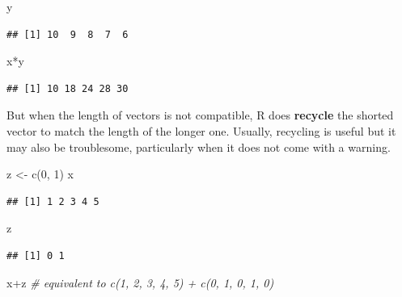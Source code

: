 \documentclass[
]{book}
\newenvironment{Shaded}{\begin{snugshade}}{\end{snugshade}}
\newcommand{\CommentTok}[1]{\textcolor[rgb]{0.56,0.35,0.01}{\textit{#1}}}
\newcommand{\DecValTok}[1]{\textcolor[rgb]{0.00,0.00,0.81}{#1}}
\newcommand{\FunctionTok}[1]{\textcolor[rgb]{0.00,0.00,0.00}{#1}}
\newcommand{\NormalTok}[1]{#1}
\newcommand{\OtherTok}[1]{\textcolor[rgb]{0.56,0.35,0.01}{#1}}
\newcommand{\SpecialCharTok}[1]{\textcolor[rgb]{0.00,0.00,0.00}{#1}}
\begin{document}
\begin{Shaded}
\begin{Highlighting}[]
\NormalTok{y}
\end{Highlighting}
\end{Shaded}

\begin{verbatim}
## [1] 10  9  8  7  6
\end{verbatim}

\begin{Shaded}
\begin{Highlighting}[]
\NormalTok{x}\SpecialCharTok{*}\NormalTok{y}
\end{Highlighting}
\end{Shaded}

\begin{verbatim}
## [1] 10 18 24 28 30
\end{verbatim}

But when the length of vectors is not compatible, R does \textbf{recycle} the shorted vector to match the length of the longer one. Usually, recycling is useful but it may also be troublesome, particularly when it does not come with a warning.

\begin{Shaded}
\begin{Highlighting}[]
\NormalTok{z }\OtherTok{\textless{}{-}} \FunctionTok{c}\NormalTok{(}\DecValTok{0}\NormalTok{, }\DecValTok{1}\NormalTok{)}
\NormalTok{x}
\end{Highlighting}
\end{Shaded}

\begin{verbatim}
## [1] 1 2 3 4 5
\end{verbatim}

\begin{Shaded}
\begin{Highlighting}[]
\NormalTok{z}
\end{Highlighting}
\end{Shaded}

\begin{verbatim}
## [1] 0 1
\end{verbatim}

\begin{Shaded}
\begin{Highlighting}[]
\NormalTok{x}\SpecialCharTok{+}\NormalTok{z }\CommentTok{\# equivalent to c(1, 2, 3, 4, 5) + c(0, 1, 0, 1, 0)}
\end{Highlighting}
\end{Shaded}
\end{document}
